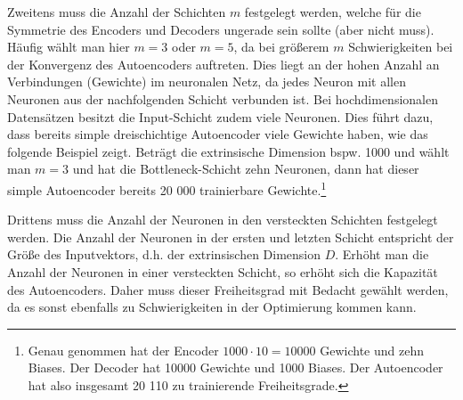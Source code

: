 Zweitens muss die Anzahl der Schichten $m$ festgelegt werden, welche für die Symmetrie des Encoders
und Decoders ungerade sein sollte (aber nicht muss). Häufig wählt man hier $m = 3$ oder $m = 5$, da
bei größerem $m$ Schwierigkeiten bei der Konvergenz des Autoencoders auftreten. Dies liegt an der
hohen Anzahl an Verbindungen (Gewichte) im neuronalen Netz, da jedes Neuron mit allen Neuronen aus
der nachfolgenden Schicht verbunden ist. Bei hochdimensionalen Datensätzen besitzt die
Input-Schicht zudem viele Neuronen. Dies führt dazu, dass bereits simple dreischichtige Autoencoder
viele Gewichte haben, wie das folgende Beispiel zeigt. Beträgt die extrinsische Dimension bspw.
1000 und wählt man $m=3$ und hat die Bottleneck-Schicht zehn Neuronen, dann hat dieser simple
Autoencoder bereits 20 000 trainierbare Gewichte.\footnote{Genau genommen hat der Encoder $1000
		\cdot 10 = 10000$ Gewichte und zehn Biases. Der Decoder hat 10000 Gewichte und 1000 Biases. Der
	Autoencoder hat also insgesamt 20 110 zu trainierende Freiheitsgrade.}

Drittens muss die Anzahl der Neuronen in den versteckten Schichten festgelegt werden. Die Anzahl
der Neuronen in der ersten und letzten Schicht entspricht der Größe des Inputvektors, d.h. der
extrinsischen Dimension $D$. Erhöht man die Anzahl der Neuronen in einer versteckten Schicht, so
erhöht sich die Kapazität des Autoencoders. Daher muss dieser Freiheitsgrad mit Bedacht gewählt
werden, da es sonst ebenfalls zu Schwierigkeiten in der Optimierung kommen kann.

